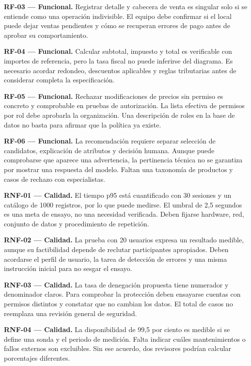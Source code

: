 \textbf{RF-03 — Funcional.} Registrar detalle y cabecera de venta es singular solo si se entiende como una operación indivisible. El equipo debe confirmar si el local puede dejar ventas pendientes y cómo se recuperan errores de pago antes de aprobar su comportamiento.

\textbf{RF-04 — Funcional.} Calcular subtotal, impuesto y total es verificable con importes de referencia, pero la tasa fiscal no puede inferirse del diagrama. Es necesario acordar redondeo, descuentos aplicables y reglas tributarias antes de considerar completa la especificación.

\textbf{RF-05 — Funcional.} Rechazar modificaciones de precios sin permiso es concreto y comprobable en pruebas de autorización. La lista efectiva de permisos por rol debe aprobarla la organización. Una descripción de roles en la base de datos no basta para afirmar que la política ya existe.

\textbf{RF-06 — Funcional.} La recomendación requiere separar selección de candidatos, explicación de atributos y decisión humana. Aunque puede comprobarse que aparece una advertencia, la pertinencia técnica no se garantiza por mostrar una respuesta del modelo. Faltan una taxonomía de productos y casos de rechazo con especialistas.

\textbf{RNF-01 — Calidad.} El tiempo p95 está cuantificado con 30 sesiones y un catálogo de 1000 registros, por lo que puede medirse. El umbral de 2,5 segundos es una meta de ensayo, no una necesidad verificada. Deben fijarse hardware, red, conjunto de datos y procedimiento de repetición.

\textbf{RNF-02 — Calidad.} La prueba con 20 usuarios expresa un resultado medible, aunque su factibilidad depende de reclutar participantes apropiados. Deben acordarse el perfil de usuario, la tarea de detección de errores y una misma instrucción inicial para no sesgar el ensayo.

\textbf{RNF-03 — Calidad.} La tasa de denegación propuesta tiene numerador y denominador claros. Para comprobar la protección deben ensayarse cuentas con permisos distintos y constatar que no cambian los datos. El total de casos no reemplaza una revisión general de seguridad.

\textbf{RNF-04 — Calidad.} La disponibilidad de 99,5 por ciento es medible si se define una sonda y el periodo de medición. Falta indicar cuáles mantenimientos o fallos externos son excluibles. Sin ese acuerdo, dos revisores podrían calcular porcentajes diferentes.

